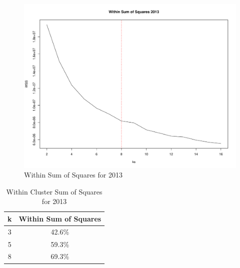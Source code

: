 \documentclass{article}
\begin{document}
    \begin{center}
        \begin{figure}
            \includegraphics[scale=0.4]{./images/wss-2013.pdf}
            \caption{Within Sum of Squares for 2013}
            \label{fig:3}
        \end{figure}
    \end{center}

    \begin{center}
        \begin{table}
            \centering
            \begin{tabular}{ |c|c| }
                \hline
                k & Within Sum of Squares \\
                \hline
                3 & 42.6\% \\
                5 & 59.3\% \\
                8 & 69.3\% \\
                \hline
            \end{tabular}
            \caption{Within Cluster Sum of Squares for 2013}
            \label{tab:2}
        \end{table}
    \end{center}
\end{document}
